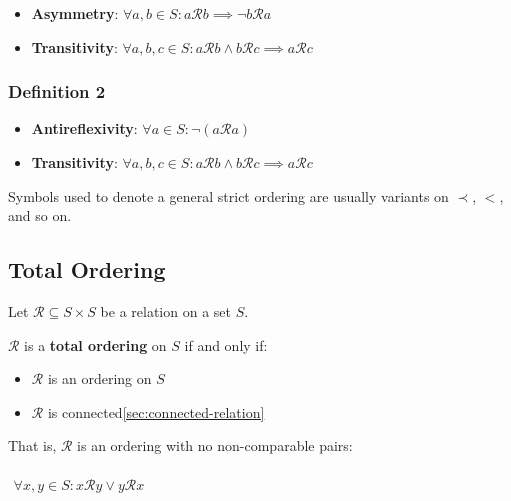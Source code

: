 \begin{itemize}
\item \textbf{Asymmetry}:
  $\forall a, b \in S : a \mathcal{R} b \implies \neg b \mathcal{R} a$
\item \textbf{Transitivity}:
  $\forall a, b, c \in S: a \mathcal{R} b \land b \mathcal{R} c
  \implies a \mathcal{R} c$
\end{itemize}

\subsubsection{Definition 2}

\begin{itemize}
\item \textbf{Antireflexivity}:
  $\forall a \in S: \neg (a \mathcal{R} a) $
\item \textbf{Transitivity}:
  $\forall a, b, c \in S: a \mathcal{R} b \land b \mathcal{R} c
  \implies a \mathcal{R} c$
\end{itemize}

Symbols used to denote a general strict ordering are usually variants
on $\prec$, $<$, and so on.


\subsection{Total Ordering}
\label{sec:total-ordering}

Let $\mathcal{R} \subseteq S \times S$ be a relation on a set $S$.

$\mathcal{R}$ is a \textbf{total ordering} on $S$ if and only if:

\begin{itemize}
\item $\mathcal{R}$ is an ordering on $S$
\item $\mathcal{R}$ is connected\ref{sec:connected-relation}
\end{itemize}

That is, $\mathcal{R}$ is an ordering with no non-comparable pairs:


\begin{math}
  \begin{array}{c}
    \\
    \forall x, y \in S: x \mathcal{R} y \lor y \mathcal{R} x\\
    \\
  \end{array}
\end{math}

